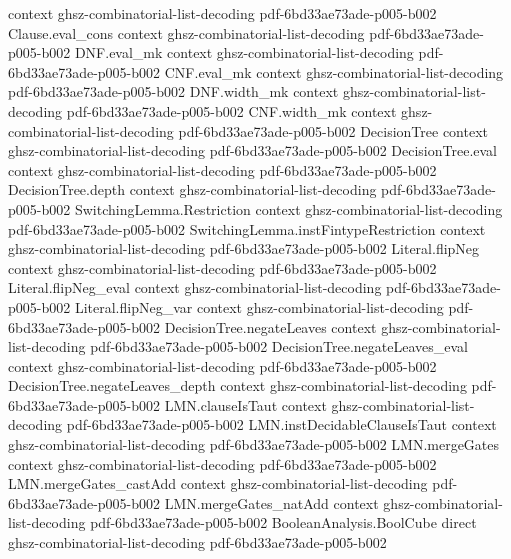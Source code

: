 \begin{lemma}
  {context}
  {ghsz-combinatorial-list-decoding}
  {pdf-6bd33ae73ade-p005-b002}
\proofstep
  {Clause.eval_cons}
  {context}
  {ghsz-combinatorial-list-decoding}
  {pdf-6bd33ae73ade-p005-b002}
\proofstep
  {DNF.eval_mk}
  {context}
  {ghsz-combinatorial-list-decoding}
  {pdf-6bd33ae73ade-p005-b002}
\proofstep
  {CNF.eval_mk}
  {context}
  {ghsz-combinatorial-list-decoding}
  {pdf-6bd33ae73ade-p005-b002}
\proofstep
  {DNF.width_mk}
  {context}
  {ghsz-combinatorial-list-decoding}
  {pdf-6bd33ae73ade-p005-b002}
\proofstep
  {CNF.width_mk}
  {context}
  {ghsz-combinatorial-list-decoding}
  {pdf-6bd33ae73ade-p005-b002}
\proofstep
  {DecisionTree}
  {context}
  {ghsz-combinatorial-list-decoding}
  {pdf-6bd33ae73ade-p005-b002}
\proofstep
  {DecisionTree.eval}
  {context}
  {ghsz-combinatorial-list-decoding}
  {pdf-6bd33ae73ade-p005-b002}
\proofstep
  {DecisionTree.depth}
  {context}
  {ghsz-combinatorial-list-decoding}
  {pdf-6bd33ae73ade-p005-b002}
\proofstep
  {SwitchingLemma.Restriction}
  {context}
  {ghsz-combinatorial-list-decoding}
  {pdf-6bd33ae73ade-p005-b002}
\proofstep
  {SwitchingLemma.instFintypeRestriction}
  {context}
  {ghsz-combinatorial-list-decoding}
  {pdf-6bd33ae73ade-p005-b002}
\proofstep
  {Literal.flipNeg}
  {context}
  {ghsz-combinatorial-list-decoding}
  {pdf-6bd33ae73ade-p005-b002}
\proofstep
  {Literal.flipNeg_eval}
  {context}
  {ghsz-combinatorial-list-decoding}
  {pdf-6bd33ae73ade-p005-b002}
\proofstep
  {Literal.flipNeg_var}
  {context}
  {ghsz-combinatorial-list-decoding}
  {pdf-6bd33ae73ade-p005-b002}
\proofstep
  {DecisionTree.negateLeaves}
  {context}
  {ghsz-combinatorial-list-decoding}
  {pdf-6bd33ae73ade-p005-b002}
\proofstep
  {DecisionTree.negateLeaves_eval}
  {context}
  {ghsz-combinatorial-list-decoding}
  {pdf-6bd33ae73ade-p005-b002}
\proofstep
  {DecisionTree.negateLeaves_depth}
  {context}
  {ghsz-combinatorial-list-decoding}
  {pdf-6bd33ae73ade-p005-b002}
\proofstep
  {LMN.clauseIsTaut}
  {context}
  {ghsz-combinatorial-list-decoding}
  {pdf-6bd33ae73ade-p005-b002}
\proofstep
  {LMN.instDecidableClauseIsTaut}
  {context}
  {ghsz-combinatorial-list-decoding}
  {pdf-6bd33ae73ade-p005-b002}
\proofstep
  {LMN.mergeGates}
  {context}
  {ghsz-combinatorial-list-decoding}
  {pdf-6bd33ae73ade-p005-b002}
\proofstep
  {LMN.mergeGates_castAdd}
  {context}
  {ghsz-combinatorial-list-decoding}
  {pdf-6bd33ae73ade-p005-b002}
\proofstep
  {LMN.mergeGates_natAdd}
  {context}
  {ghsz-combinatorial-list-decoding}
  {pdf-6bd33ae73ade-p005-b002}
\proofstep
  {BooleanAnalysis.BoolCube}
  {direct}
  {ghsz-combinatorial-list-decoding}
  {pdf-6bd33ae73ade-p005-b002}

\end{lemma}
